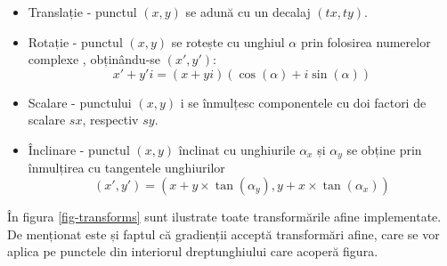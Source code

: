 \documentclass[a4paper, 12pt]{report}
\begin{document}
\begin{itemize}
    \item{Translație - punctul \((x, y)\) se adună cu un decalaj \((tx, ty)\).}
    \item{Rotație - punctul \((x, y)\) se rotește cu unghiul \(\alpha\) prin folosirea numerelor complexe \cite{affine_transform_rotation}, obținându-se \((x', y')\):
                \[x' + y' i = (x + y i) (\cos(\alpha) + i \sin(\alpha))\]}
    \item{Scalare - punctului \((x, y)\) i se înmulțesc componentele cu doi factori de scalare \(sx\), respectiv \(sy\).}
    \item{Înclinare - punctul \((x, y)\) înclinat cu unghiurile \(\alpha_x\) și \(\alpha_y\) se obține prin înmulțirea cu tangentele unghiurilor \cite{affine_transform_skew}
                \[(x', y') = (x + y \times \tan(\alpha_y), y + x \times \tan(\alpha_x))\]}
\end{itemize}

În figura \ref{fig-transforms} sunt ilustrate toate transformările afine implementate. De menționat este și faptul că gradienții
acceptă transformări afine, care se vor aplica pe punctele din interiorul dreptunghiului care acoperă figura.
\end{document}
